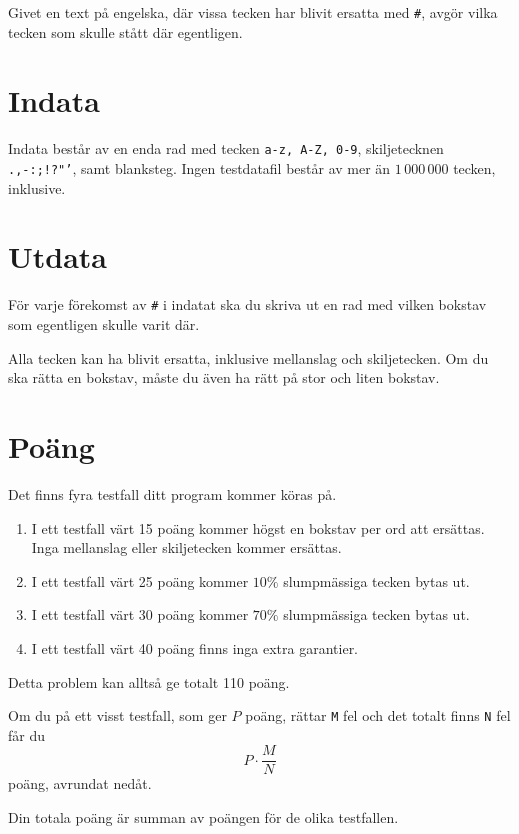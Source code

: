 
Givet en text på engelska, där vissa tecken har blivit ersatta med \texttt{#}, avgör vilka tecken som skulle stått där egentligen.

\section*{Indata}
Indata består av en enda rad med tecken \texttt{a-z, A-Z, 0-9}, skiljetecknen \texttt{.,-:;!?"'}, samt blanksteg.
Ingen testdatafil består av mer än $1\,000\,000$ tecken, inklusive.

\section*{Utdata}
För varje förekomst av \texttt{#} i indatat ska du skriva ut en rad med vilken bokstav som egentligen skulle varit där.

Alla tecken kan ha blivit ersatta, inklusive mellanslag och skiljetecken. Om du ska rätta en bokstav, måste du även ha rätt på stor och liten bokstav.

\section*{Poäng}

Det finns fyra testfall ditt program kommer köras på.
\begin{enumerate}
  \item I ett testfall värt 15 poäng kommer högst en bokstav per ord att ersättas. Inga mellanslag eller skiljetecken kommer ersättas.
  \item I ett testfall värt 25 poäng kommer $10\%$ slumpmässiga tecken bytas ut.
  \item I ett testfall värt 30 poäng kommer $70\%$ slumpmässiga tecken bytas ut.
  \item I ett testfall värt 40 poäng finns inga extra garantier.
\end{enumerate}

Detta problem kan alltså ge totalt 110 poäng.

Om du på ett visst testfall, som ger $P$ poäng, rättar \texttt{M} fel och det totalt finns \texttt{N} fel får du 
$$P \cdot \frac{M}{N}$$
poäng, avrundat nedåt.

Din totala poäng är summan av poängen för de olika testfallen.
